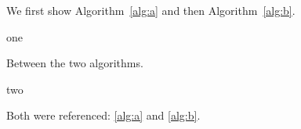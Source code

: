 \documentclass{article}
\begin{document}
We first show Algorithm~\ref{alg:a} and then Algorithm~\ref{alg:b}.

\begin{algorithm}[h]
\caption{First}\label{alg:a}
\begin{algorithmic}
\State one
\end{algorithmic}
\end{algorithm}

Between the two algorithms.

\begin{algorithm}[h]
\caption{Second}\label{alg:b}
\begin{algorithmic}
\State two
\end{algorithmic}
\end{algorithm}

Both were referenced: \ref{alg:a} and \ref{alg:b}.
\end{document}
